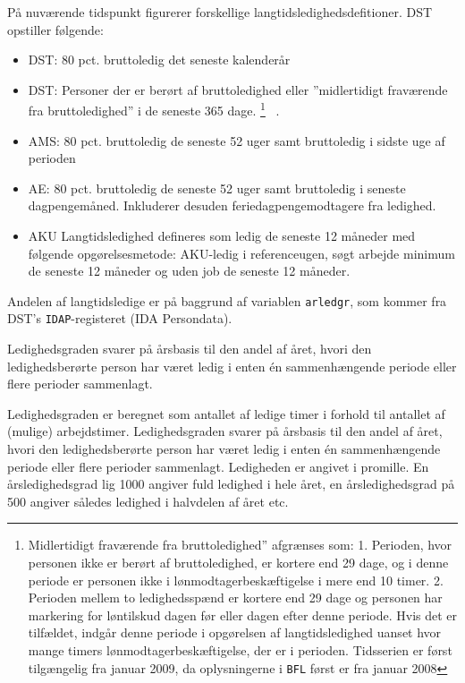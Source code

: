 På nuværende tidspunkt figurerer forskellige langtidsledighedsdefitioner. DST \parencite{Grunnet-Lauridsen2014} opstiller følgende: 
\begin{itemize} [topsep=6pt,itemsep=-1ex]
  \item DST: 80 pct. bruttoledig det seneste kalenderår
  \item DST: Personer der er berørt af bruttoledighed eller ”midlertidigt fraværende fra bruttoledighed” i de seneste 365 dage.%
%
\footnote{Midlertidigt fraværende fra bruttoledighed” afgrænses som: 1. Perioden, hvor personen ikke er berørt af bruttoledighed, er kortere end 29 dage, og i denne periode er personen ikke i lønmodtagerbeskæftigelse i mere end 10 timer. 2. Perioden mellem to ledighedsspænd er kortere end 29 dage og personen har markering for løntilskud dagen før eller dagen efter denne periode. Hvis det er tilfældet, indgår denne periode i opgørelsen af langtidsledighed uanset hvor mange timers lønmodtagerbeskæftigelse, der er i perioden. Tidsserien er først tilgængelig fra januar 2009, da oplysningerne i \texttt{BFL} først er fra januar 2008}%
%
\ .
  \item AMS: 80 pct. bruttoledig de seneste 52 uger samt bruttoledig i sidste uge af perioden
  \item AE: 80 pct. bruttoledig de seneste 52 uger samt bruttoledig i seneste dagpengemåned. Inkluderer desuden feriedagpengemodtagere fra ledighed.
  \item AKU Langtidsledighed defineres som ledig de seneste 12 måneder med følgende opgørelsesmetode: AKU-ledig i referenceugen, søgt arbejde minimum de seneste 12 måneder og uden job de seneste 12 måneder.
\end{itemize}
%

Andelen af langtidsledige er på baggrund af variablen \texttt{arledgr}, som kommer fra DST's \texttt{IDAP}-registeret (IDA Persondata).

Ledighedsgraden svarer på årsbasis til den andel af året, hvori den ledighedsberørte person har været ledig i enten én sammenhængende periode eller flere perioder sammenlagt.

Ledighedsgraden er beregnet som antallet af ledige timer i forhold til antallet af (mulige) arbejdstimer. Ledighedsgraden svarer på årsbasis til den andel af året, hvori den ledighedsberørte person har været ledig i enten én sammenhængende periode eller flere perioder sammenlagt. Ledigheden er angivet i promille. En årsledighedsgrad lig 1000 angiver fuld ledighed i hele året, en årsledighedsgrad på 500 angiver således ledighed i halvdelen af året etc.

